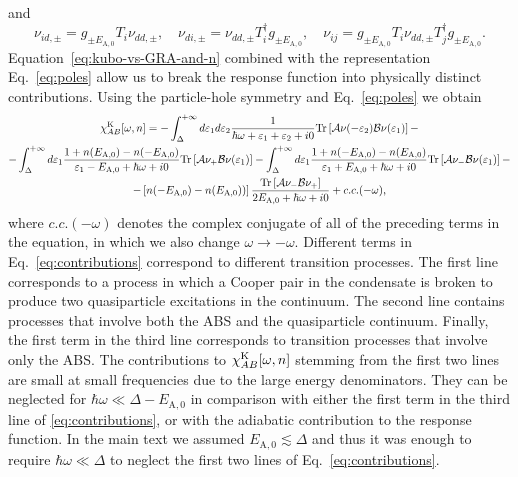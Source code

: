 \documentclass[aps,reprint,longbibliography, prb]{revtex4-2}
\begin{document}
and
\begin{equation}
\nu_{id,\pm} = g_{\pm E_\mathrm{A,0}} T_i \nu_{dd,\pm} ,\quad\nu_{di,\pm} = \nu_{dd,\pm} T_i^\dagger g_{\pm E_\mathrm{A,0}},\quad\nu_{ij} =  g_{\pm E_\mathrm{A,0}} T_i\nu_{dd,\pm} T_j^\dagger g_{\pm E_\mathrm{A,0}}.
\end{equation}
Equation~\eqref{eq:kubo-vs-GRA-and-n} combined with the representation Eq.~\eqref{eq:poles} allow us to break the response function into physically distinct contributions. Using the particle-hole symmetry and Eq.~\eqref{eq:poles} we obtain
\begin{gather}
\chi_{AB}^\mathrm{K}[\omega, n] =  -\int_{\Delta}^{+\infty}d\varepsilon_{1}d\varepsilon_{2}\frac{1}{\hbar\omega+\varepsilon_{1}+\varepsilon_{2}+i0}\mathrm{Tr}\left[\mathcal{A}\nu(-\varepsilon_{2})\mathcal{B}\nu(\varepsilon_{1})\right]-\notag\\
\label{eq:contributions}
-\int_{\Delta}^{+\infty}d\varepsilon_1\frac{1+n(E_{\rm A,0})-n(-E_{\rm A,0})}{\varepsilon_{1}-E_{\rm A,0}+\hbar\omega+i0}\mathrm{Tr}\left[\mathcal{A}\nu_+\mathcal{B}\nu(\varepsilon_{1})\right] -\int_{\Delta}^{+\infty}d\varepsilon_1\frac{1+n(-E_{\rm A,0})-n(E_{\rm A,0})}{\varepsilon_{1}+E_{\rm A,0}+\hbar\omega+i0}\mathrm{Tr}\left[\mathcal{A}\nu_-\mathcal{B}\nu(\varepsilon_{1})\right]-\\
-\left[n(-E_{\rm A,0})-n(E_{\rm A,0}))\right]\frac{\mathrm{Tr}\left[\mathcal{A}\nu_-\mathcal{B}\nu_+\right]}{2E_{\rm A,0}+\hbar\omega+i0}+c.c.(-\omega),\notag
\end{gather}
where $c.c.(-\omega)$ denotes the complex conjugate of all of the preceding terms in the equation, in which we also change $\omega \rightarrow - \omega$. Different terms in Eq.~\eqref{eq:contributions} correspond to different transition processes. 
The first line corresponds to a process in which a Cooper pair in the condensate is broken to produce two quasiparticle excitations in the continuum. The second line contains processes that involve both the ABS and the quasiparticle continuum. Finally, the first term in the third line corresponds to transition processes that involve only the ABS. The contributions to $\chi^{\rm K}_{AB}[\omega, n]$ stemming from the first two lines are small at small frequencies due to the large energy denominators. They can be neglected for $\hbar\omega \ll \Delta - E_\mathrm{A,0}$ in comparison with either the first term in the third line of \eqref{eq:contributions}, or with the adiabatic contribution to the response function. In the main text we assumed $E_\mathrm{A,0} \lesssim \Delta$ and thus it was enough to require $\hbar\omega \ll \Delta$ to neglect the first two lines of Eq.~\eqref{eq:contributions}.
\end{document}
